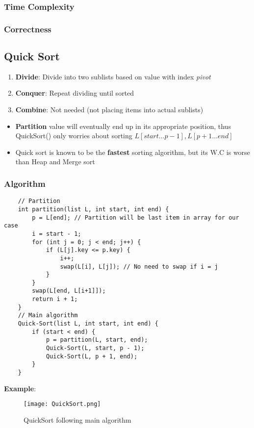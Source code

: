 \documentclass[10pt, 
a4paper, 
oneside, 
headinclude, footinclude, 
BCOR5mm]
{scrartcl}
\begin{document}
\subsubsection{Time Complexity}
\subsubsection{Correctness}
\newpage
\subsection{Quick Sort}
\begin{enumerate}
    \item \textbf{Divide}: Divide into two sublists based on value with index \textit{pivot}
    \item \textbf{Conquer}: Repeat dividing until sorted
    \item \textbf{Combine}: Not needed (not placing items into actual sublists)
\end{enumerate}
\begin{itemize}
    \item \textbf{Partition} value will eventually end up in its appropriate position, thus QuickSort() only worries about sorting $L[start...p-1], L[p+1...end]$
    \item Quick sort is known to be the \textbf{fastest} sorting algorithm, but its W.C is worse than Heap and Merge sort
\end{itemize}
\subsubsection{Algorithm}
\begin{lstlisting}
    // Partition
    int partition(list L, int start, int end) {
        p = L[end]; // Partition will be last item in array for our case
        i = start - 1;
        for (int j = 0; j < end; j++) {
            if (L[j].key <= p.key) {
                i++;
                swap(L[i], L[j]); // No need to swap if i = j
            }
        }
        swap(L[end, L[i+1]]);
        return i + 1;
    }
    // Main algorithm
    Quick-Sort(list L, int start, int end) {
        if (start < end) {
            p = partition(L, start, end);
            Quick-Sort(L, start, p - 1);
            Quick-Sort(L, p + 1, end);
        }
    }
\end{lstlisting}
\newpage
\textbf{Example}:
\begin{figure}[H]
    \begin{center}
        \texttt{[image: QuickSort.png]}
        \caption{QuickSort following main algorithm}
    \end{center}
\end{figure}
\end{document}
